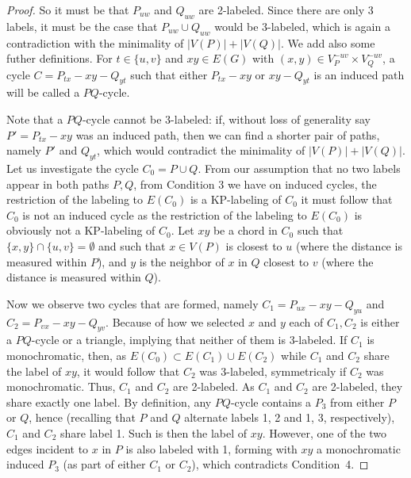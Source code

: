 \documentclass[12pt,a4paper,titlepage,openany]{report}
\begin{document}
\begin{proof}
So it must be that $P_{uw}$ and $Q_{uw}$ are 2-labeled. Since there are only 3 labels, it must be the case that $P_{uw}\cup Q_{uw}$ would be 3-labeled, which is again a contradiction with the minimality of $|V(P)|+|V(Q)|$. \newline
We add also some futher definitions. For $t \in \{u, v\}$ and $xy \in E(G)$ with $(x, y) \in V_P^{-uv} \times V_Q^{-uv}$, a cycle $C = P_{tx}-xy-Q_{yt}$ such that either $P_{tx}-xy$ or $xy-Q_{yt}$ is an induced path will be called a $PQ$-cycle. 

Note that a $P Q$-cycle cannot be 3-labeled: if, without loss of generality say $P' = P_{tx} -xy$ was an induced path, then we can find a shorter pair of paths, namely $P'$ and $Q_{yt}$, which would contradict the minimality of $|V(P)|+|V(Q)|$.\newline
Let us investigate the cycle $C_0=P\cup Q$. From our assumption that no two labels appear in both paths $P,Q$, from Condition 3 we have on induced cycles, the restriction of the labeling to $E(C_0)$ is a KP-labeling of $C_0$ it must follow that $C_0$ is not an induced cycle as the restriction of the labeling to $E(C_0)$ is obviously not a KP-labeling of $C_0$. Let $xy$ be a chord in $C_0$ such that $\{x, y\} \cap \{u, v\} = \emptyset$ and such that $x \in V (P )$ is closest to $u$ (where the distance is measured within $P$), and $y$ is the neighbor of $x$ in $Q$ closest to $v$ (where the distance is measured within $Q$).

 Now we observe two cycles that are formed, namely $C_1 = P_{ux}-xy-Q_{yu}$ and $C_2 = P_{vx} -xy-Q_{yv}$. Because of how we selected $x$ and $y$ each of $C_1,C_2$ is either a $P Q$-cycle or a triangle, implying that neither of them is 3-labeled. If $C_1$ is monochromatic, then, as $E(C_0) \subset E(C_1 ) \cup E(C_2)$ while $C_1$ and $C_2$ share the label of $xy$, it would follow that $C_2$ was 3-labeled, symmetricaly if $C_2$ was monochromatic. Thus, $C_1$ and $C_2$ are 2-labeled. \newline
As $C_1$ and $C_2$ are 2-labeled, they share exactly one label. By definition, any $P Q$-cycle contains a $P_3$ from either $P$ or $Q$, hence (recalling that $P$ and $Q$ alternate labels 1, 2 and 1, 3, respectively), $C_1$ and $C_2$ share label 1. Such is then the label of $xy$. However, one of the two edges incident to $x$ in $P$ is also labeled with 1, forming with $xy$ a monochromatic
induced $P_3$ (as part of either $C_1$ or $C_2$), which contradicts Condition~4. 
\end{proof}
\end{document}
